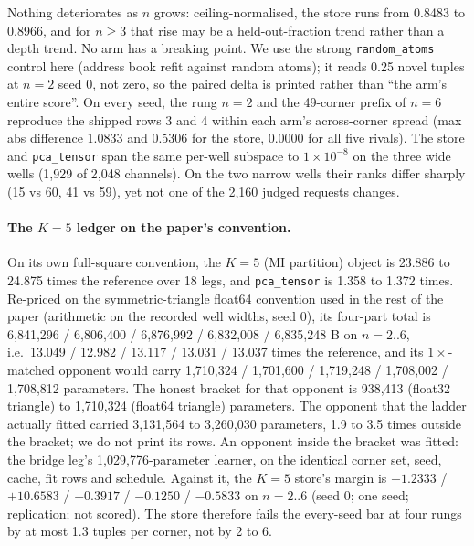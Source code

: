\documentclass{article} %
\newcommand{\sci}[2]{\ensuremath{#1\times10^{#2}}}
\begin{document}
\noindent Nothing deteriorates as $n$ grows: ceiling-normalised, the store runs from 0.8483 to
0.8966, and for $n\ge3$ that rise may be a held-out-fraction trend rather than a depth trend. No
arm has a breaking point. We use the strong \texttt{random\_atoms} control here (address book
refit against random atoms); it reads 0.25 novel tuples at $n=2$ seed 0, not zero, so the paired
delta is printed rather than ``the arm's entire score''. %
On every seed, the rung $n=2$ and the 49-corner prefix of $n=6$ reproduce the shipped rows 3 and
4 within each arm's across-corner spread (max abs difference 1.0833 and 0.5306 for the store,
0.0000 for all five rivals). %
The store and \texttt{pca\_tensor} span the same per-well subspace to \sci{1}{-8} on the three
wide wells (1,929 of 2,048 channels). On the two narrow wells their ranks differ sharply (15 vs 60,
41 vs 59), yet not one of the 2,160 judged requests changes. %

\paragraph{The $K=5$ ledger on the paper's convention.} On its own full-square convention, the
$K=5$ (MI partition) object is 23.886 to 24.875 times the reference over 18 legs, and
\texttt{pca\_tensor} is 1.358 to 1.372 times. %
Re-priced on the symmetric-triangle float64 convention used in the rest of the paper (arithmetic
on the recorded well widths, seed 0), its four-part total is 6,841,296 / 6,806,400 / 6,876,992 / 6,832,008
/ 6,835,248 B on $n=2..6$, i.e.\ 13.049 / 12.982 / 13.117 / 13.031 / 13.037 times the reference, and its
$1\times$-matched opponent would carry 1,710,324 / 1,701,600 / 1,719,248 / 1,708,002 / 1,708,812
parameters. %
The honest bracket for that opponent is 938,413 (float32 triangle) to 1,710,324 (float64
triangle) parameters. The opponent that the ladder actually fitted carried 3,131,564 to 3,260,030
parameters, 1.9 to 3.5 times outside the bracket; we do not print its rows.
An opponent inside the bracket was fitted: the bridge leg's 1,029,776-parameter learner, on the
identical corner set, seed, cache, fit rows and schedule. Against it, the $K=5$ store's margin is
$-1.2333$ / $+10.6583$ / $-0.3917$ / $-0.1250$ / $-0.5833$ on $n=2..6$ (seed 0; one seed;
replication; not scored). The store therefore fails the every-seed bar at four rungs by at most
1.3 tuples per corner, not by 2 to 6. %
\end{document}
